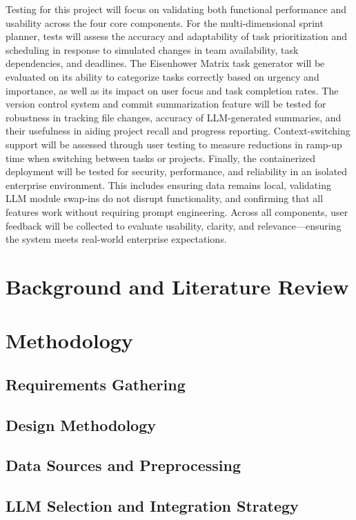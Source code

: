 \documentclass{report}
\begin{document}
Testing for this project will focus on validating both functional performance and usability across the four core components. For the multi-dimensional sprint planner, tests will assess the accuracy and adaptability of task prioritization and scheduling in response to simulated changes in team availability, task dependencies, and deadlines. The Eisenhower Matrix task generator will be evaluated on its ability to categorize tasks correctly based on urgency and importance, as well as its impact on user focus and task completion rates.
The version control system and commit summarization feature will be tested for robustness in tracking file changes, accuracy of LLM-generated summaries, and their usefulness in aiding project recall and progress reporting. Context-switching support will be assessed through user testing to measure reductions in ramp-up time when switching between tasks or projects.
Finally, the containerized deployment will be tested for security, performance, and reliability in an isolated enterprise environment. This includes ensuring data remains local, validating LLM module swap-ins do not disrupt functionality, and confirming that all features work without requiring prompt engineering. Across all components, user feedback will be collected to evaluate usability, clarity, and relevance—ensuring the system meets real-world enterprise expectations.

\chapter{Background and Literature Review}  %


\chapter{Methodology}  %
\section{Requirements Gathering}
\section{Design Methodology}
\section{Data Sources and Preprocessing}
\section{LLM Selection and Integration Strategy}
\end{document}
